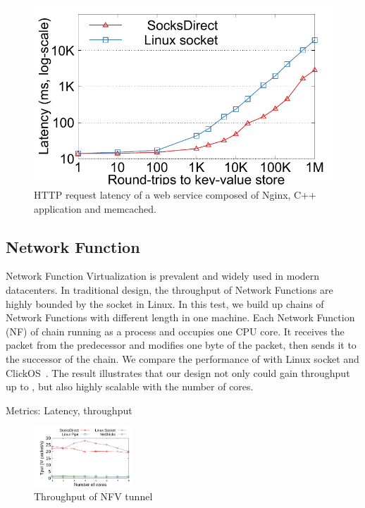 \begin{figure}[t!]
\begin{minipage}{.31\textwidth}
		\centering \includegraphics[width=\textwidth]{eval/microbenchmark/nginx-multiround-tput.pdf}
		\vspace{-15pt}
		\caption{HTTP request latency of a web service composed of Nginx, C++ application and memcached.}
		\label{fig:eval-nginx-multiround}
	\end{minipage}
\end{figure}

\subsection{Network Function}

Network Function Virtualization is prevalent and widely used in modern datacenters. In traditional design, the throughput of Network Functions are highly bounded by the socket in Linux. In this test, we build up chains of Network Functions with different length in one machine. Each Network Function (NF) of chain running as a process and occupies one CPU core. It receives the packet from the predecessor and modifies one byte of the packet, then sends it to the successor of the chain. We compare the performance of \sys{} with Linux socket and ClickOS~\cite{martins2014clickos}. The result illustrates that our design not only could gain throughput up to , but also highly scalable with the number of cores.



Metrics: Latency, throughput

\begin{figure}[htpb]
	\centering
	\includegraphics[width=0.33\textwidth]{eval/microbenchmark/nfv-tun-tput.pdf}
	\caption{Throughput of NFV tunnel}
	\label{fig:eval-tun-tput}
\end{figure}



